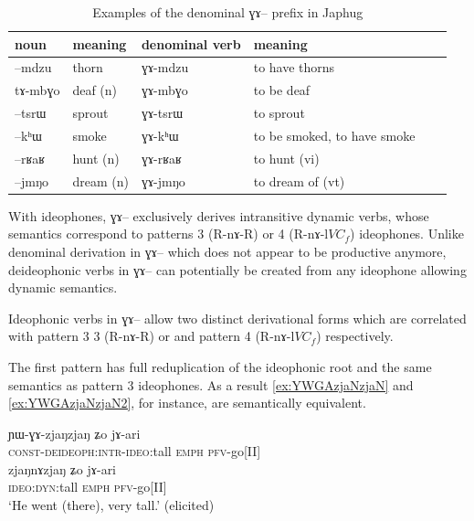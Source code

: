 \documentclass[oldfontcommands,oneside,a4paper,11pt]{article}
\newcommand{\ipa}[1]{{\phon \mbox{#1}}} %
\begin{document}
 \begin{table}[h]
 \caption{Examples of the denominal \ipa{ɣɤ--} prefix in Japhug} \label{tab:denom.GA}
\begin{tabular}{llllll}
\toprule
noun &meaning &denominal verb & meaning\\
\midrule
 \ipa{--mdzu} &thorn & \ipa{ɣɤ-mdzu} &to have thorns \\
  \ipa{tɤ-mbɣo} &deaf (n) & \ipa{ɣɤ-mbɣo} &to be deaf \\
\midrule
 \ipa{--tsrɯ} &sprout & \ipa{ɣɤ-tsrɯ} &to sprout\\
  \ipa{--kʰɯ} &smoke & \ipa{ɣɤ-kʰɯ} &to be smoked, to have smoke \\
    \midrule
  \ipa{--rʁaʁ} &hunt (n) & \ipa{ɣɤ-rʁaʁ} &to hunt (vi) \\
   \ipa{--jmŋo} &dream (n) & \ipa{ɣɤ-jmŋo} &to dream of (vt) \\ 
  \bottomrule
  \end{tabular}
 \end{table}
 
 With ideophones, \ipa{ɣɤ--} exclusively derives intransitive dynamic verbs, whose semantics correspond to patterns 3 (R-\ipa{nɤ}-R) or 4 (R-\ipa{nɤ-l}$VC_f$) ideophones. Unlike denominal derivation in \ipa{ɣɤ--} which does not appear to be productive anymore,  deideophonic verbs in \ipa{ɣɤ--} can potentially be created from any ideophone allowing dynamic semantics.
 
Ideophonic verbs in \ipa{ɣɤ--} allow two distinct derivational forms which are correlated with pattern 3 3 (R-\ipa{nɤ}-R) or  and pattern 4 (R-\ipa{nɤ-l}$VC_f$) respectively.

 The first pattern has full reduplication of the ideophonic root and the same semantics as pattern 3 ideophones. As a result  \ref{ex:YWGAzjaNzjaN} and \ref{ex:YWGAzjaNzjaN2}, for instance, are semantically equivalent. 

 		 

     \begin{exe}
\ex \label{ex:YWGAzjaNzjaN}
\gll 
 \ipa{ɲɯ-ɣɤ-zjaŋzjaŋ}  	\ipa{ʑo}  	\ipa{jɤ-ari}  \\
 \textsc{const-deideoph:intr-ideo}:tall   \textsc{emph} \textsc{pfv}-go[II]\\
 \ex \label{ex:YWGAzjaNzjaN2}
\gll 
 \ipa{zjaŋnɤzjaŋ}  	\ipa{ʑo}  	\ipa{jɤ-ari}  \\
 \textsc{ideo:dyn}:tall   \textsc{emph} \textsc{pfv}-go[II]\\
 \glt `He went (there), very tall.' (elicited)
\end{exe}
\end{document}
